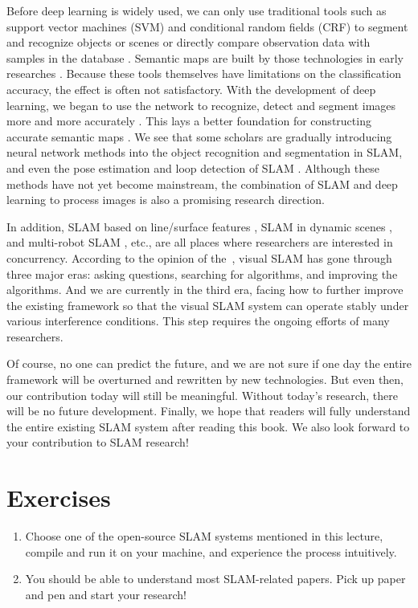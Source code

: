 Before deep learning is widely used, we can only use traditional tools such as support vector machines (SVM) and conditional random fields (CRF) to segment and recognize objects or scenes or directly compare observation data with samples in the database {\cite{Salas- Moreno2013, Salas-Moreno2014}}. Semantic maps are built by those technologies in early researches {\cite{Anand2012, Stueckler2012, Kostavelis2013, Couprie2013}}. Because these tools themselves have limitations on the classification accuracy, the effect is often not satisfactory. With the development of deep learning, we began to use the network to recognize, detect and segment images more and more accurately {\cite{Deng2009, Krizhevsky2012, He2015, Ren2015, Long2014, Zheng2015}}. This lays a better foundation for constructing accurate semantic maps {\cite{Gupta2014}}. We see that some scholars are gradually introducing neural network methods into the object recognition and segmentation in SLAM, and even the pose estimation and loop detection of SLAM {\cite{Konda2015, Kendall2015, Hou2015}}. Although these methods have not yet become mainstream, the combination of SLAM and deep learning to process images is also a promising research direction.

In addition, SLAM based on line/surface features  {\cite{An2012, Zhou2015, Benedettelli2012}} , SLAM in dynamic scenes {\cite{Saarinen2013, Maddern2012, Wang2008}}, and multi-robot SLAM {\cite{Zou2013, Gil2010a, Vidal-Calleja2011}}, etc., are all places where researchers are interested in concurrency. According to the opinion of the~\cite{Cadena2016}, visual SLAM has gone through three major eras: asking questions, searching for algorithms, and improving the algorithms. And we are currently in the third era, facing how to further improve the existing framework so that the visual SLAM system can operate stably under various interference conditions. This step requires the ongoing efforts of many researchers.

Of course, no one can predict the future, and we are not sure if one day the entire framework will be overturned and rewritten by new technologies. But even then, our contribution today will still be meaningful. Without today's research, there will be no future development. Finally, we hope that readers will fully understand the entire existing SLAM system after reading this book. We also look forward to your contribution to SLAM research!

\section*{Exercises}
\begin{enumerate}
	\item Choose one of the open-source SLAM systems mentioned in this lecture, compile and run it on your machine, and experience the process intuitively.
	\item You should be able to understand most SLAM-related papers. Pick up paper and pen and start your research!
\end{enumerate}
